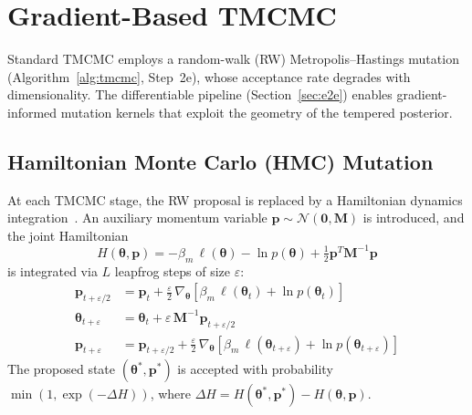 \documentclass[11pt,a4paper]{article}
\begin{document}
\section{Gradient-Based TMCMC}
\label{sec:gradient_tmcmc}

Standard TMCMC employs a random-walk (RW) Metropolis--Hastings mutation (Algorithm~\ref{alg:tmcmc}, Step~2e), whose acceptance rate degrades with dimensionality. The differentiable pipeline (Section~\ref{sec:e2e}) enables gradient-informed mutation kernels that exploit the geometry of the tempered posterior.

\subsection{Hamiltonian Monte Carlo (HMC) Mutation}

At each TMCMC stage, the RW proposal is replaced by a Hamiltonian dynamics integration~\cite{Neal2011HMC}. An auxiliary momentum variable $\mathbf{p} \sim \mathcal{N}(\mathbf{0}, \mathbf{M})$ is introduced, and the joint Hamiltonian
\begin{equation}
  H(\boldsymbol{\theta}, \mathbf{p}) = -\beta_m\,\ell(\boldsymbol{\theta}) - \ln p(\boldsymbol{\theta}) + \tfrac{1}{2}\mathbf{p}^T\mathbf{M}^{-1}\mathbf{p}
  \label{eq:hamiltonian}
\end{equation}
is integrated via $L$ leapfrog steps of size $\varepsilon$:
\begin{align}
  \mathbf{p}_{t+\varepsilon/2} &= \mathbf{p}_t + \tfrac{\varepsilon}{2}\,\nabla_{\boldsymbol{\theta}}\!\left[\beta_m\,\ell(\boldsymbol{\theta}_t) + \ln p(\boldsymbol{\theta}_t)\right] \label{eq:leapfrog1} \\
  \boldsymbol{\theta}_{t+\varepsilon} &= \boldsymbol{\theta}_t + \varepsilon\,\mathbf{M}^{-1}\mathbf{p}_{t+\varepsilon/2} \label{eq:leapfrog2} \\
  \mathbf{p}_{t+\varepsilon} &= \mathbf{p}_{t+\varepsilon/2} + \tfrac{\varepsilon}{2}\,\nabla_{\boldsymbol{\theta}}\!\left[\beta_m\,\ell(\boldsymbol{\theta}_{t+\varepsilon}) + \ln p(\boldsymbol{\theta}_{t+\varepsilon})\right] \label{eq:leapfrog3}
\end{align}
The proposed state $(\boldsymbol{\theta}^*, \mathbf{p}^*)$ is accepted with probability $\min(1, \exp(-\Delta H))$, where $\Delta H = H(\boldsymbol{\theta}^*, \mathbf{p}^*) - H(\boldsymbol{\theta}, \mathbf{p})$.
\end{document}
